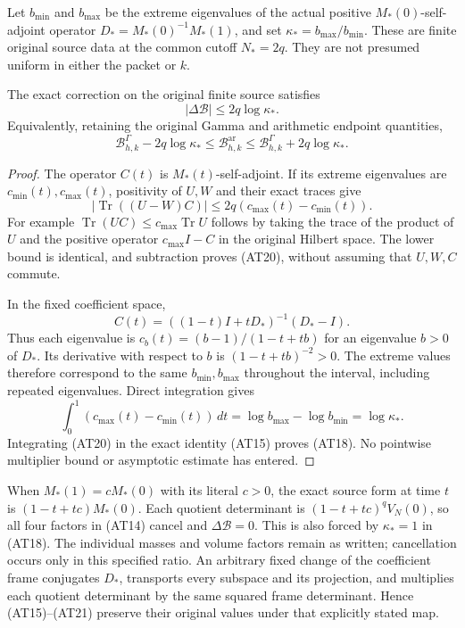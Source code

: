 \documentclass{article}
\newcommand{\Tr}{\operatorname{Tr}}
\newcommand{\ar}{\mathrm{ar}}
\newcommand{\Ga}{\Gamma}
\begin{document}
Let $b_{\min}$ and $b_{\max}$ be the extreme eigenvalues of the
actual positive $M_*(0)$-self-adjoint operator
$D_*=M_*(0)^{-1}M_*(1)$, and set
$\kappa_*=b_{\max}/b_{\min}$. These are finite original source
data at the common cutoff $N_*=2q$. They are not presumed
uniform in either the packet or $k$.

\begin{theorem}
The exact correction on the original finite source satisfies
\[
 \boxed{|\Delta\mathcal B|\le2q\log\kappa_* .}             \tag{AT18}
\]
Equivalently, retaining the original Gamma and arithmetic endpoint
quantities,
\[
 \mathcal B^\Ga_{h,k}-2q\log\kappa_*
 \le\mathcal B^\ar_{h,k}
 \le\mathcal B^\Ga_{h,k}+2q\log\kappa_* .                \tag{AT19}
\]
\end{theorem}
\begin{proof}
The operator $C(t)$ is $M_*(t)$-self-adjoint. If its extreme
eigenvalues are $c_{\min}(t),c_{\max}(t)$, positivity of $U,W$
and their exact traces give
\[
 |\Tr((U-W)C)|\le2q(c_{\max}(t)-c_{\min}(t)).             \tag{AT20}
\]
For example $\Tr(UC)\le c_{\max}\Tr U$ follows by taking
the trace of the product of $U$ and the positive operator
$c_{\max}I-C$ in the original Hilbert space. The lower bound
is identical, and subtraction proves (AT20), without assuming
that $U,W,C$ commute.

In the fixed coefficient space,
\[
 C(t)=((1-t)I+tD_*)^{-1}(D_*-I).
\]
Thus each eigenvalue is
$c_b(t)=(b-1)/(1-t+tb)$ for an eigenvalue $b>0$ of $D_*$.
Its derivative with respect to $b$ is $(1-t+tb)^{-2}>0$.
The extreme values therefore correspond to the same
$b_{\min},b_{\max}$ throughout the interval, including repeated
eigenvalues. Direct integration gives
\[
 \int_0^1(c_{\max}(t)-c_{\min}(t))\,dt
 =\log b_{\max}-\log b_{\min}=\log\kappa_* .             \tag{AT21}
\]
Integrating (AT20) in the exact identity (AT15) proves (AT18).
No pointwise multiplier bound or asymptotic estimate has entered.
\end{proof}

When $M_*(1)=cM_*(0)$ with its literal $c>0$, the exact source
form at time $t$ is $(1-t+tc)M_*(0)$. Each quotient determinant
is $(1-t+tc)^qV_N(0)$, so all four factors in (AT14) cancel
and $\Delta\mathcal B=0$. This is also forced by
$\kappa_*=1$ in (AT18). The individual masses and volume
factors remain as written; cancellation occurs only in this
specified ratio. An arbitrary fixed change of the coefficient
frame conjugates $D_*$, transports every subspace and its
projection, and multiplies each quotient determinant by the
same squared frame determinant. Hence (AT15)--(AT21) preserve
their original values under that explicitly stated map.
\end{document}

